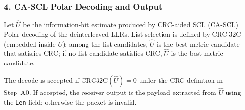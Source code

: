 \documentclass[11pt]{article}
\begin{document}
\subsubsection*{4. CA-SCL Polar Decoding and Output}

Let $\hat U$ be the information-bit estimate produced by CRC-aided SCL (CA-SCL) Polar decoding of the deinterleaved LLRs. List selection is defined by CRC-32C (embedded inside $U$): among the list candidates, $\hat U$ is the best-metric candidate that satisfies CRC; if no list candidate satisfies CRC, $\hat U$ is the best-metric candidate.

The decode is accepted if $\mathrm{CRC32C}(\hat U)=0$ under the CRC definition in Step~A0. If accepted, the receiver output is the payload extracted from $\hat U$ using the \texttt{Len} field; otherwise the packet is invalid.
\end{document}
